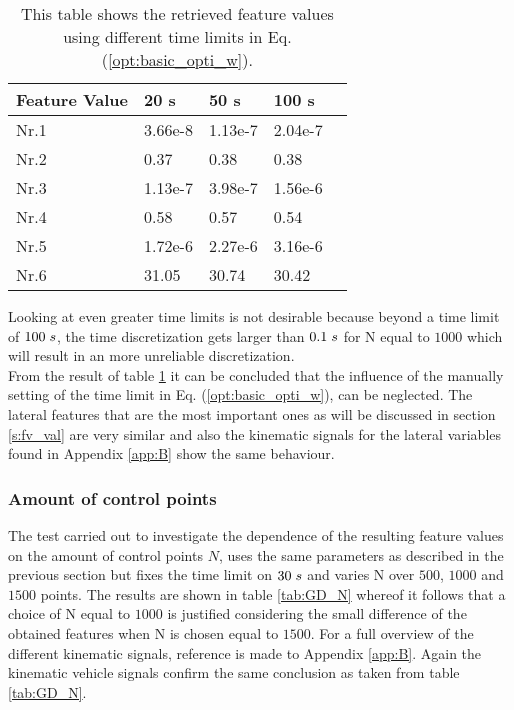 \begin{table}[h!]
	\centering
	\begin{tabular}{@{}llllr@{}} \toprule
		\textbf{Feature Value}    & 20 s  & 50 s      & 100 s\\ \midrule
		Nr.1       & 3.66e-8     & 1.13e-7   & 2.04e-7\\
		Nr.2       & 0.37        & 0.38      & 0.38\\
		Nr.3       & 1.13e-7     & 3.98e-7   & 1.56e-6 \\
		Nr.4       & 0.58        & 0.57      & 0.54\\
		Nr.5       & 1.72e-6     & 2.27e-6   & 3.16e-6\\
		Nr.6       & 31.05       & 30.74     & 30.42\\ \bottomrule
	\end{tabular}
	\caption{This table shows the retrieved feature values using different time limits in Eq. (\ref{opt:basic_opti_w}).}
	\label{tab:GD_time_limit}
\end{table}
Looking at even greater time limits is not desirable because beyond a time limit of $100 \hspace{1mm}s$, the time discretization gets larger than $0.1\hspace{1mm}s$ for N equal to $1000$ which will result in an more unreliable discretization.\\

From the result of table \ref{tab:GD_time_limit} it can be concluded that the influence of the manually setting of the time limit in Eq. (\ref{opt:basic_opti_w}), can be neglected. The lateral features that are the most important ones as will be discussed in section \ref{s:fv_val} are very similar and also the kinematic signals for the lateral variables found in Appendix \ref{app:B} show the same behaviour.

\subsubsection{Amount of control points}
The test carried out to investigate the dependence of the resulting feature values on the amount of control points $N$, uses the same parameters as described in the previous section but fixes the time limit on $30\hspace{1mm}s$ and varies N over $500$, $1000$ and $1500$ points. The results are shown in table \ref{tab:GD_N} whereof it follows that a choice of N equal to $1000$ is justified considering the small difference of the obtained features when N is chosen equal to $1500$. For a full overview of the different kinematic signals, reference is made to Appendix \ref{app:B}. Again the kinematic vehicle signals confirm the same conclusion as taken from table \ref{tab:GD_N}.

